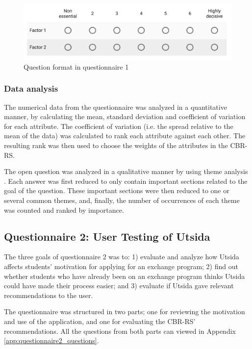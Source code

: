 \begin{figure}[h]
    \centering
    \includegraphics[width=\textwidth]{fig/question1.png}
    \caption{Question format in questionnaire 1}
    \label{fig:semantic_scale}
\end{figure}

\FloatBarrier

\subsubsection{Data analysis}

The numerical data from the questionnaire was analyzed in a quantitative manner, by calculating the mean, standard deviation and coefficient of variation for each attribute. The coefficient of variation (i.e. the spread relative to the mean of the data) was calculated to rank each attribute against each other. The resulting rank was then used to choose the weights of the attributes in the CBR-RS.

The open question was analyzed in a qualitative manner by using theme analysis \cite{oates2005researching}. Each answer was first reduced to only contain important sections related to the goal of the question. These important sections were then reduced to one or several common themes, and, finally, the number of occurrences of each theme was counted and ranked by importance.

\subsection{Questionnaire 2: User Testing of Utsida}\label{sec:questionnaire_2}

The three goals of questionnaire 2 was to: 1) evaluate and analyze how Utsida affects students' motivation for applying for an exchange program; 2) find out whether students who have already been on an exchange program thinks Utsida could have made their process easier; and 3) evaluate if Utsida gave relevant recommendations to the user.

The questionnaire was structured in two parts; one for reviewing the motivation and use of the application, and one for evaluating the CBR-RS' recommendations. All the questions from both parts can viewed in Appendix \ref{app:questionnaire2_questions}.

